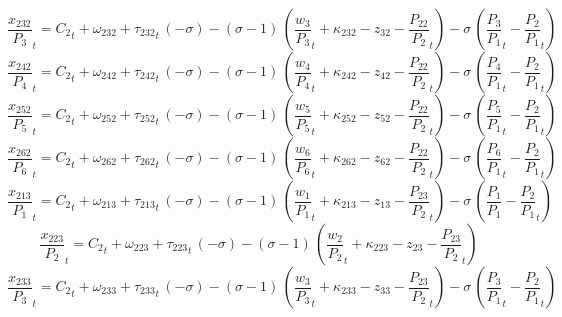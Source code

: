 \begin{dmath}
{{\frac{x_{232}}{P_{3}}}}_{t}={{C_{2}}}_{t}+{{\omega_{232}}}+{{\tau_{232}}}_{t}\, \left(-{{\sigma}}\right)-\left({{\sigma}}-1\right)\, \left({{\frac{w_{3}}{P_{3}}}}_{t}+{{\kappa_{232}}}-{{z_{32}}}-{{\frac{P_{22}}{P_{2}}}}_{t}\right)-{{\sigma}}\, \left({{\frac{P_{3}}{P_{1}}}}_{t}-{{\frac{P_{2}}{P_{1}}}}_{t}\right)
\end{dmath}
\begin{dmath}
{{\frac{x_{242}}{P_{4}}}}_{t}={{C_{2}}}_{t}+{{\omega_{242}}}+{{\tau_{242}}}_{t}\, \left(-{{\sigma}}\right)-\left({{\sigma}}-1\right)\, \left({{\frac{w_{4}}{P_{4}}}}_{t}+{{\kappa_{242}}}-{{z_{42}}}-{{\frac{P_{22}}{P_{2}}}}_{t}\right)-{{\sigma}}\, \left({{\frac{P_{4}}{P_{1}}}}_{t}-{{\frac{P_{2}}{P_{1}}}}_{t}\right)
\end{dmath}
\begin{dmath}
{{\frac{x_{252}}{P_{5}}}}_{t}={{C_{2}}}_{t}+{{\omega_{252}}}+{{\tau_{252}}}_{t}\, \left(-{{\sigma}}\right)-\left({{\sigma}}-1\right)\, \left({{\frac{w_{5}}{P_{5}}}}_{t}+{{\kappa_{252}}}-{{z_{52}}}-{{\frac{P_{22}}{P_{2}}}}_{t}\right)-{{\sigma}}\, \left({{\frac{P_{5}}{P_{1}}}}_{t}-{{\frac{P_{2}}{P_{1}}}}_{t}\right)
\end{dmath}
\begin{dmath}
{{\frac{x_{262}}{P_{6}}}}_{t}={{C_{2}}}_{t}+{{\omega_{262}}}+{{\tau_{262}}}_{t}\, \left(-{{\sigma}}\right)-\left({{\sigma}}-1\right)\, \left({{\frac{w_{6}}{P_{6}}}}_{t}+{{\kappa_{262}}}-{{z_{62}}}-{{\frac{P_{22}}{P_{2}}}}_{t}\right)-{{\sigma}}\, \left({{\frac{P_{6}}{P_{1}}}}_{t}-{{\frac{P_{2}}{P_{1}}}}_{t}\right)
\end{dmath}
\begin{dmath}
{{\frac{x_{213}}{P_{1}}}}_{t}={{C_{2}}}_{t}+{{\omega_{213}}}+{{\tau_{213}}}_{t}\, \left(-{{\sigma}}\right)-\left({{\sigma}}-1\right)\, \left({{\frac{w_{1}}{P_{1}}}}_{t}+{{\kappa_{213}}}-{{z_{13}}}-{{\frac{P_{23}}{P_{2}}}}_{t}\right)-{{\sigma}}\, \left({{\frac{P_{1}}{P_{1}}}}-{{\frac{P_{2}}{P_{1}}}}_{t}\right)
\end{dmath}
\begin{dmath}
{{\frac{x_{223}}{P_{2}}}}_{t}={{C_{2}}}_{t}+{{\omega_{223}}}+{{\tau_{223}}}_{t}\, \left(-{{\sigma}}\right)-\left({{\sigma}}-1\right)\, \left({{\frac{w_{2}}{P_{2}}}}_{t}+{{\kappa_{223}}}-{{z_{23}}}-{{\frac{P_{23}}{P_{2}}}}_{t}\right)
\end{dmath}
\begin{dmath}
{{\frac{x_{233}}{P_{3}}}}_{t}={{C_{2}}}_{t}+{{\omega_{233}}}+{{\tau_{233}}}_{t}\, \left(-{{\sigma}}\right)-\left({{\sigma}}-1\right)\, \left({{\frac{w_{3}}{P_{3}}}}_{t}+{{\kappa_{233}}}-{{z_{33}}}-{{\frac{P_{23}}{P_{2}}}}_{t}\right)-{{\sigma}}\, \left({{\frac{P_{3}}{P_{1}}}}_{t}-{{\frac{P_{2}}{P_{1}}}}_{t}\right)
\end{dmath}
